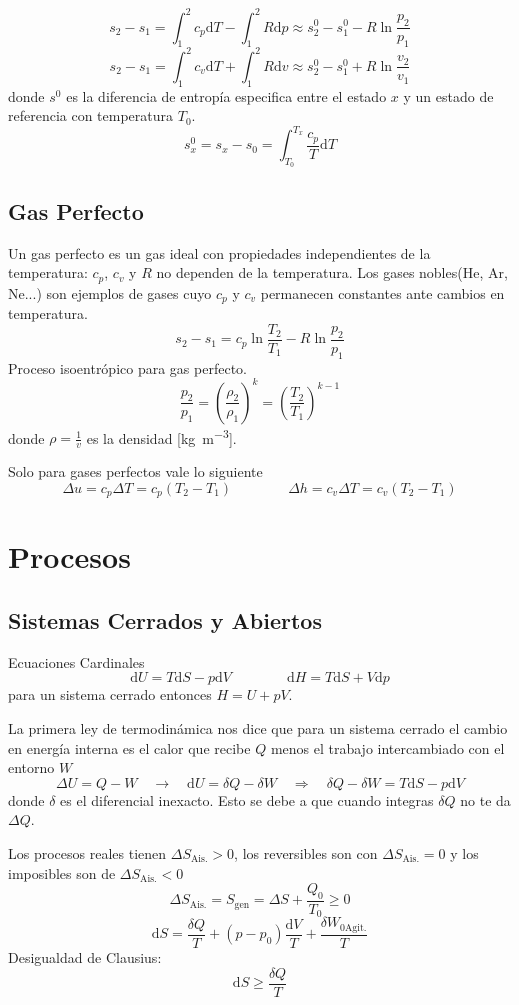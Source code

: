 \documentclass{article}
\newcommand{\ctegas}{k}
\newcommand{\cp}{c_{p}}
\newcommand{\cv}{c_{v}}
\newcommand{\snaught}{s^{0}}
\newcommand{\agitacion}{\textrm{Agit.}}
\newcommand{\Sgen}{S_{\textrm{gen}}}
\newcommand{\sib}[1]{[\si{#1}]}
\newcommand{\aislado}{\textrm{Ais.}}
\newcommand{\di}{\textrm{d}}
\begin{document}
\[
s_2 -s_1 = \int_1^2\cp \di T - \int_1^2R\di p \approx \snaught_2 -\snaught_1 -R\ln \frac{p_2}{p_1}
\]
\[
s_2 -s_1 = \int_1^2\cv \di T +\int_1^2R\di v\approx \snaught_2 -\snaught_1 +R\ln \frac{v_2}{v_1}
\]
donde $\snaught$ es la diferencia de entropía especifica entre el estado $x$ y un estado de referencia con temperatura $T_0$.
\[
s^0_x=s_x - s_0 = \int_{T_0}^{T_x}\frac{\cp}{T}\di T
\]
\subsection{Gas Perfecto}
Un gas perfecto es un gas ideal con propiedades independientes de la temperatura: $\cp$, $\cv$ y $R$ no dependen de la temperatura. Los gases nobles(He, Ar, Ne...) son ejemplos de gases cuyo $\cp$ y $\cv$ permanecen constantes ante cambios en temperatura.
\[
s_2 -s_1 = \cp \ln \frac{T_2}{T_1} - R \ln \frac{p_2}{p_1}
\]
Proceso isoentrópico para gas perfecto.
\[
\frac{p_2}{p_1} = \left(\frac{\rho_2}{\rho_1}\right)^\ctegas = \left( \frac{T_2}{T_1}\right)^{\ctegas-1}
\]
donde $\rho=\frac{1}{v}$ es la densidad \sib{\kilogram \per \meter \cubed}.\par

Solo para gases perfectos vale lo siguiente
\[
\Delta u = \cp \Delta T=\cp (T_2-T_1) \qquad \qquad \Delta h = \cv \Delta T = \cv(T_2-T_1)
\]
\section{Procesos}
\subsection{Sistemas Cerrados y Abiertos}
Ecuaciones Cardinales
\begin{equation}
    \di U = T\di S - p\di V \qquad \qquad \di H = T\di S +V \di p
\end{equation}
para un sistema cerrado entonces $H = U+pV$.

La primera ley de termodinámica nos dice que para un sistema cerrado el cambio en energía interna es el calor que recibe $Q$ menos el trabajo intercambiado con el entorno $W$ 
\[
\Delta U = Q-W \quad \rightarrow \quad \di U =\delta Q - \delta W \quad \Rightarrow\quad \delta Q -\delta W = T\di S - p\di V
\]
donde $\delta$ es el diferencial inexacto. Esto se debe a que cuando integras $\delta Q$ no te da $\Delta Q$.

Los procesos reales tienen $\Delta S_\aislado > 0$, los reversibles son con $\Delta S_\aislado = 0$ y los imposibles son de $\Delta S_\aislado < 0$
\[
\Delta S_{\aislado}=\Sgen = \Delta S + \frac{Q_0}{T_0}\geq 0
\]
\[
\di S = \frac{\delta Q}{T} + (p-p_0)\frac{\di V}{T} +\frac{\delta W_{0\agitacion}}{T} %
\]
Desigualdad de Clausius:
\[
\di S \geq \frac{\delta Q}{T}
\]
\end{document}
